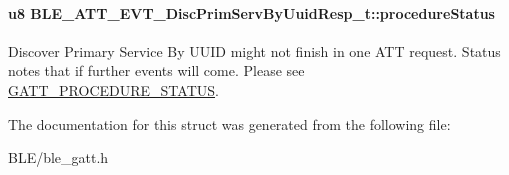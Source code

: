 \paragraph[{\texorpdfstring{procedure\+Status}{procedureStatus}}]{\setlength{\rightskip}{0pt plus 5cm}u8 B\+L\+E\+\_\+\+A\+T\+T\+\_\+\+E\+V\+T\+\_\+\+Disc\+Prim\+Serv\+By\+Uuid\+Resp\+\_\+t\+::procedure\+Status}\hypertarget{struct_b_l_e___a_t_t___e_v_t___disc_prim_serv_by_uuid_resp__t_add498d4f207cafa6cc2da115df0f4988}{}\label{struct_b_l_e___a_t_t___e_v_t___disc_prim_serv_by_uuid_resp__t_add498d4f207cafa6cc2da115df0f4988}
Discover Primary Service By U\+U\+ID might not finish in one A\+TT request. Status notes that if further events will come. Please see \hyperlink{group___g_a_t_t___p_r_o_c_e_d_u_r_e___s_t_a_t_u_s}{G\+A\+T\+T\+\_\+\+P\+R\+O\+C\+E\+D\+U\+R\+E\+\_\+\+S\+T\+A\+T\+US}. 

The documentation for this struct was generated from the following file\+:\begin{DoxyCompactItemize}
\item 
B\+L\+E/ble\+\_\+gatt.\+h\end{DoxyCompactItemize}
